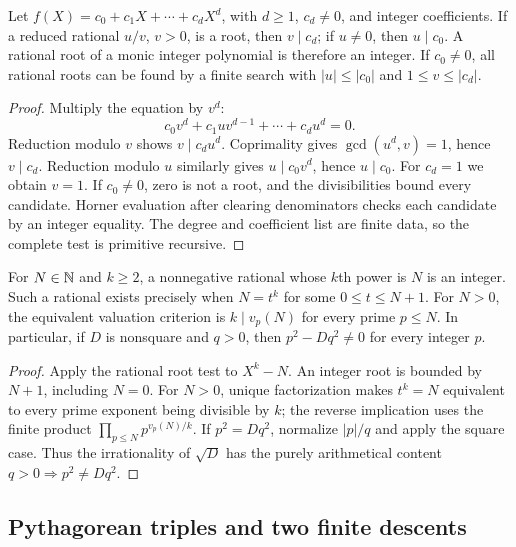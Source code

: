 \begin{theorem}\label{dio:rational-root}
Let $f(X)=c_0+c_1X+\cdots+c_dX^d$, with $d\geq1$, $c_d\ne0$,
and integer coefficients. If a reduced rational $u/v$, $v>0$, is a
root, then $v\mid c_d$; if $u\ne0$, then $u\mid c_0$.
A rational root of a monic integer polynomial is therefore an integer.
If $c_0\ne0$, all rational roots can be found by a finite search with
$|u|\leq|c_0|$ and $1\leq v\leq|c_d|$.
\end{theorem}
\begin{proof}
Multiply the equation by $v^d$:
\[
 c_0v^d+c_1uv^{d-1}+\cdots+c_du^d=0.
\]
Reduction modulo $v$ shows $v\mid c_du^d$. Coprimality gives
$\gcd(u^d,v)=1$, hence $v\mid c_d$. Reduction modulo $u$ similarly
gives $u\mid c_0v^d$, hence $u\mid c_0$. For $c_d=1$ we obtain $v=1$.
If $c_0\ne0$, zero is not a root, and the divisibilities bound every
candidate. Horner evaluation after clearing denominators checks each
candidate by an integer equality. The degree and coefficient list are
finite data, so the complete test is primitive recursive.
\end{proof}

\begin{corollary}\label{dio:powers}
For $N\in\mathbb N$ and $k\geq2$, a nonnegative rational whose $k$th power is
$N$ is an integer. Such a rational exists precisely when
$N=t^k$ for some $0\leq t\leq N+1$.
For $N>0$, the equivalent valuation criterion is
$k\mid v_p(N)$ for every prime $p\leq N$.
In particular, if $D$ is nonsquare and $q>0$, then
$p^2-Dq^2\ne0$ for every integer $p$.
\end{corollary}
\begin{proof}
Apply the rational root test to $X^k-N$. An integer root is bounded
by $N+1$, including $N=0$. For $N>0$, unique factorization makes
$t^k=N$ equivalent to every prime exponent being divisible by $k$;
the reverse implication uses the finite product
$\prod_{p\leq N}p^{v_p(N)/k}$.
If $p^2=Dq^2$, normalize $|p|/q$ and apply the square case.
Thus the irrationality of $\sqrt D$ has the purely arithmetical content
$q>0\Longrightarrow p^2\ne Dq^2$.
\end{proof}

\subsection{Pythagorean triples and two finite descents}

